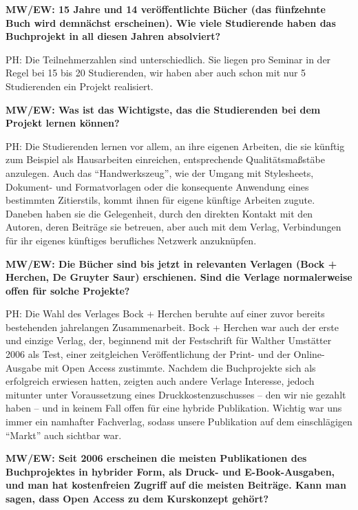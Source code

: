\documentclass[a4paper,
fontsize=11pt,
oneside,
numbers=noperiodatend,
parskip=half-,
bibliography=totoc,
final
]{scrartcl}
\begin{document}
\textbf{MW/EW: 15 Jahre und 14 veröffentlichte Bücher (das fünfzehnte
Buch wird demnächst erscheinen). Wie viele Studierende haben das
Buchprojekt in all diesen Jahren absolviert?}

PH: Die Teilnehmerzahlen sind unterschiedlich. Sie liegen pro Seminar in
der Regel bei 15 bis 20 Studierenden, wir haben aber auch schon mit nur
5 Studierenden ein Projekt realisiert.

\textbf{MW/EW: Was ist das Wichtigste, das die Studierenden bei dem
Projekt lernen können?}

PH: Die Studierenden lernen vor allem, an ihre eigenen Arbeiten, die sie
künftig zum Beispiel als Hausarbeiten einreichen, entsprechende
Qualitätsmaßstäbe anzulegen. Auch das \enquote{Handwerkszeug}, wie der
Umgang mit Stylesheets, Dokument- und Formatvorlagen oder die
konsequente Anwendung eines bestimmten Zitierstils, kommt ihnen für
eigene künftige Arbeiten zugute. Daneben haben sie die Gelegenheit,
durch den direkten Kontakt mit den Autoren, deren Beiträge sie betreuen,
aber auch mit dem Verlag, Verbindungen für ihr eigenes künftiges
berufliches Netzwerk anzuknüpfen.

\textbf{MW/EW: Die Bücher sind bis jetzt in relevanten Verlagen (Bock +
Herchen, De Gruyter Saur) erschienen. Sind die Verlage normalerweise
offen für solche Projekte?}

PH: Die Wahl des Verlages Bock + Herchen beruhte auf einer zuvor bereits
bestehenden jahrelangen Zusammenarbeit. Bock + Herchen war auch der
erste und einzige Verlag, der, beginnend mit der Festschrift für Walther
Umstätter 2006 als Test, einer zeitgleichen Veröffentlichung der Print-
und der Online-Ausgabe mit Open Access zustimmte. Nachdem die
Buchprojekte sich als erfolgreich erwiesen hatten, zeigten auch andere
Verlage Interesse, jedoch mitunter unter Voraussetzung eines
Druckkostenzuschusses -- den wir nie gezahlt haben -- und in keinem Fall
offen für eine hybride Publikation. Wichtig war uns immer ein namhafter
Fachverlag, sodass unsere Publikation auf dem einschlägigen
\enquote{Markt} auch sichtbar war.

\textbf{MW/EW: Seit 2006 erscheinen die meisten Publikationen des
Buchprojektes in hybrider Form, als Druck- und E-Book-Ausgaben, und man
hat kostenfreien Zugriff auf die meisten Beiträge. Kann man sagen, dass
Open Access zu dem Kurskonzept gehört?}
\end{document}
